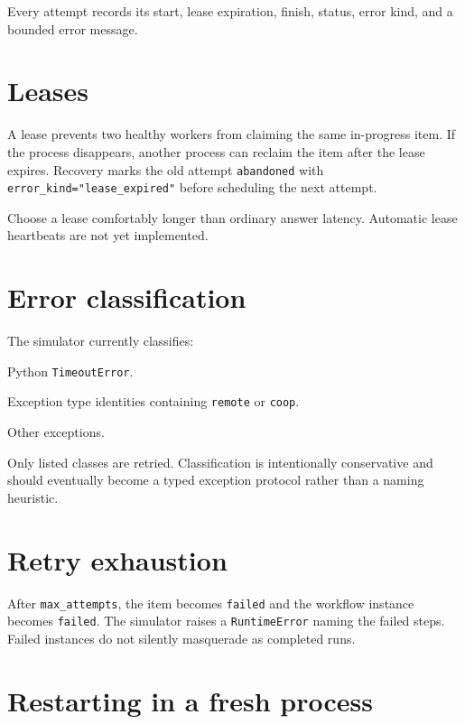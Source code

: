 \documentclass[
  10pt,
]{report}
\providecommand{\tightlist}{%
  \setlength{\itemsep}{0pt}\setlength{\parskip}{0pt}}
\begin{document}
Every attempt records its start, lease expiration, finish, status, error
kind, and a bounded error message.

\section{Leases}\label{leases}

A lease prevents two healthy workers from claiming the same in-progress
item. If the process disappears, another process can reclaim the item
after the lease expires. Recovery marks the old attempt
\texttt{abandoned} with \texttt{error\_kind="lease\_expired"} before
scheduling the next attempt.

Choose a lease comfortably longer than ordinary answer latency.
Automatic lease heartbeats are not yet implemented.

\section{Error classification}\label{error-classification}

The simulator currently classifies:

\begin{description}
\tightlist
\item[\texttt{timeout}]
Python \texttt{TimeoutError}.
\item[\texttt{remote\_error}]
Exception type identities containing \texttt{remote} or \texttt{coop}.
\item[\texttt{exception}]
Other exceptions.
\end{description}

Only listed classes are retried. Classification is intentionally
conservative and should eventually become a typed exception protocol
rather than a naming heuristic.

\section{Retry exhaustion}\label{retry-exhaustion}

After \texttt{max\_attempts}, the item becomes \texttt{failed} and the
workflow instance becomes \texttt{failed}. The simulator raises a
\texttt{RuntimeError} naming the failed steps. Failed instances do not
silently masquerade as completed runs.

\section{Restarting in a fresh
process}\label{restarting-in-a-fresh-process}
\end{document}
